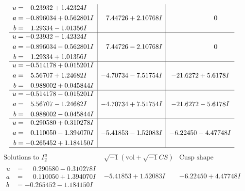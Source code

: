 \documentclass[1p]{elsarticle_modified}
\theoremstyle{definition}
\newcommand{\I}{\sqrt{-1}}
\begin{document}
$$\begin{array}{c|c|c}
\begin{aligned}
u &= -0.23932 + 1.42324 I \\
a &= -0.896034 + 0.562801 I \\
b &= \phantom{-}1.29334 - 1.01356 I\end{aligned}
 & \phantom{-}7.44726 + 2.10768 I & \phantom{-0.000000 } 0 \\ \hline\begin{aligned}
u &= -0.23932 - 1.42324 I \\
a &= -0.896034 - 0.562801 I \\
b &= \phantom{-}1.29334 + 1.01356 I\end{aligned}
 & \phantom{-}7.44726 - 2.10768 I & \phantom{-0.000000 } 0 \\ \hline\begin{aligned}
u &= -0.514178 + 0.015201 I \\
a &= \phantom{-}5.56707 + 1.24682 I \\
b &= \phantom{-}0.988002 + 0.045844 I\end{aligned}
 & -4.70734 - 7.51754 I & -21.6272 + 5.6178 I \\ \hline\begin{aligned}
u &= -0.514178 - 0.015201 I \\
a &= \phantom{-}5.56707 - 1.24682 I \\
b &= \phantom{-}0.988002 - 0.045844 I\end{aligned}
 & -4.70734 + 7.51754 I & -21.6272 - 5.6178 I \\ \hline\begin{aligned}
u &= \phantom{-}0.290580 + 0.310278 I \\
a &= \phantom{-}0.110050 - 1.394070 I \\
b &= -0.265452 + 1.184150 I\end{aligned}
 & -5.41853 - 1.52083 I & -6.22450 - 4.47748 I\\
 \hline 
 \end{array}$$\newpage$$\begin{array}{c|c|c}  
\text{Solutions to }I^u_{2}& \I (\text{vol} + \sqrt{-1}CS) & \text{Cusp shape}\\
 \hline 
\begin{aligned}
u &= \phantom{-}0.290580 - 0.310278 I \\
a &= \phantom{-}0.110050 + 1.394070 I \\
b &= -0.265452 - 1.184150 I\end{aligned}
 & -5.41853 + 1.52083 I & -6.22450 + 4.47748 I \\ \hline\begin{aligned}

\end{aligned}
\end{array}$$
\end{document}
